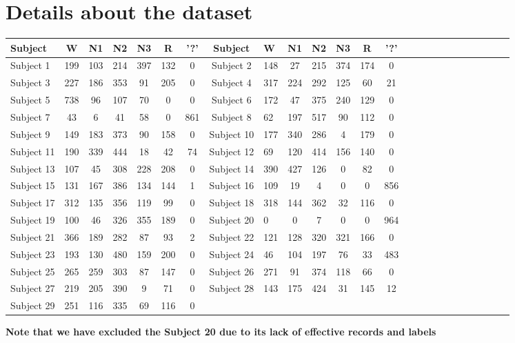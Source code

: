 \documentclass[journal]{IEEEtran}
\begin{document}

{}  
  
\onecolumn
\appendices
\section{Details about the dataset}
\vspace{0.3cm}
\renewcommand{\arraystretch}{2}
\centering
\begin{tabular}{lccccccclccccccclcccccccl}

Subject & W & N1 & N2 & N3 & R & '?' & Subject & W & N1 & N2 & N3 & R & '?' \\ 
\midrule
Subject 1 & 199 & 103 & 214 & 397 & 132 & 0 & 
Subject 2 & 148 & 27 & 215 & 374 & 174 & 0 \\
Subject 3 & 227 & 186 & 353 & 91 & 205 & 0 & 
Subject 4 & 317 & 224 & 292 & 125 & 60 & 21 \\
Subject 5 & 738 & 96 & 107 & 70 & 0 & 0 &
Subject 6 & 172 & 47 & 375 & 240 & 129 & 0 \\ 
Subject 7 & 43 & 6 & 41 & 58 & 0 & 861 & 
Subject 8 & 62 & 197 & 517 & 90 & 112 & 0 \\
Subject 9 & 149 & 183 & 373 & 90 & 158 & 0 & 
Subject 10 & 177 & 340 & 286 & 4 & 179 & 0 \\
Subject 11 & 190 & 339 & 444 & 18 & 42 & 74 &
Subject 12 & 69 & 120 & 414 & 156 & 140 & 0 \\ 
Subject 13 & 107 & 45 & 308 & 228 & 208 & 0 &
Subject 14 & 390 & 427 & 126 & 0 & 82 & 0 \\
Subject 15 & 131 & 167 & 386 & 134 & 144 & 1 & 
Subject 16 & 109 & 19 & 4 & 0 & 0 & 856 \\
Subject 17 & 312 & 135 & 356 & 119 & 99 & 0 &
Subject 18 & 318 & 144 & 362 & 32 & 116 & 0 \\   
Subject 19 & 100 & 46 & 326 & 355 & 189 & 0 &
Subject 20 & 0 & 0 & 7 & 0 & 0 & 964 \\
Subject 21 & 366 & 189 & 282 & 87 & 93 & 2 &
Subject 22 & 121 & 128 & 320 & 321 & 166 & 0 \\
Subject 23 & 193 & 130 & 480 & 159 & 200 & 0 &
Subject 24 & 46 & 104 & 197 & 76 & 33 & 483 \\ 
Subject 25 & 265 & 259 & 303 & 87 & 147 & 0 &
Subject 26 & 271 & 91 & 374 & 118 & 66 & 0 \\
Subject 27 & 219 & 205 & 390 & 9 & 71 & 0 &
Subject 28 & 143 & 175 & 424 & 31 & 145 & 12 \\
Subject 29 & 251 & 116 & 335 & 69 & 116 & 0 & & & & & & & \\
\end{tabular}
 
\vspace{0.7cm}
\textbf{Note that we have excluded the Subject 20 due to its lack of effective records and labels}




























\end{document}
